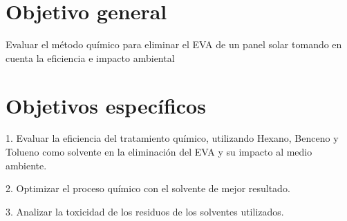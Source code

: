 \section{Objetivo general}
\label{sec:Objetivo general}
Evaluar el método químico para eliminar el EVA de un panel solar tomando en cuenta la eficiencia e impacto ambiental

\section{Objetivos específicos}
\label{sec:Objetivos específicos}
1.	Evaluar la eficiencia del tratamiento químico, utilizando Hexano, Benceno y Tolueno como solvente en la eliminación del EVA y su impacto al medio ambiente.

2.	Optimizar el proceso químico con el solvente de mejor resultado. 

3.	Analizar la toxicidad de los residuos de los solventes utilizados. 


